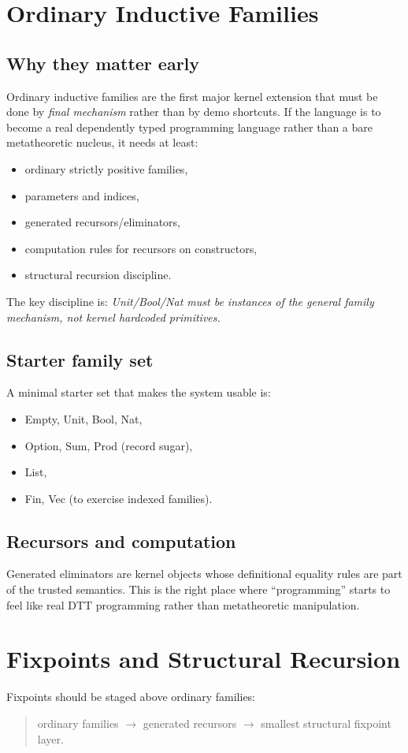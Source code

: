 \documentclass[11pt]{article}
\begin{document}
\section{Ordinary Inductive Families}
\subsection{Why they matter early}
Ordinary inductive families are the first major kernel extension that must be done by \emph{final mechanism} rather than by demo shortcuts. If the language is to become a real dependently typed programming language rather than a bare metatheoretic nucleus, it needs at least:
\begin{itemize}
  \item ordinary strictly positive families,
  \item parameters and indices,
  \item generated recursors/eliminators,
  \item computation rules for recursors on constructors,
  \item structural recursion discipline.
\end{itemize}

The key discipline is: \emph{Unit/Bool/Nat must be instances of the general family mechanism, not kernel hardcoded primitives.}

\subsection{Starter family set}
A minimal starter set that makes the system usable is:
\begin{itemize}
  \item Empty, Unit, Bool, Nat,
  \item Option, Sum, Prod (record sugar),
  \item List,
  \item Fin, Vec (to exercise indexed families).
\end{itemize}

\subsection{Recursors and computation}
Generated eliminators are kernel objects whose definitional equality rules are part of the trusted semantics. This is the right place where ``programming'' starts to feel like real DTT programming rather than metatheoretic manipulation.

\section{Fixpoints and Structural Recursion}
Fixpoints should be staged above ordinary families:
\begin{quote}
ordinary families $\to$ generated recursors $\to$ smallest structural fixpoint layer.
\end{quote}
\end{document}
